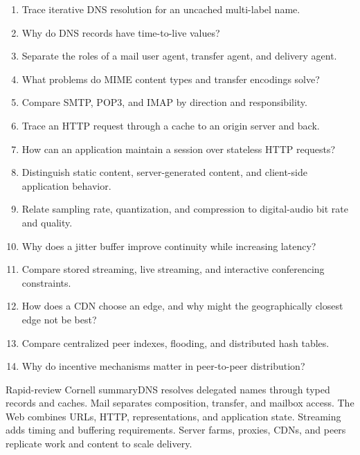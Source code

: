 \documentclass[10pt,letterpaper]{article}
\begin{document}

\begin{enumerate}
  \item Trace iterative DNS resolution for an uncached multi-label name.
  \item Why do DNS records have time-to-live values?
  \item Separate the roles of a mail user agent, transfer agent, and delivery agent.
  \item What problems do MIME content types and transfer encodings solve?
  \item Compare SMTP, POP3, and IMAP by direction and responsibility.
  \item Trace an HTTP request through a cache to an origin server and back.
  \item How can an application maintain a session over stateless HTTP requests?
  \item Distinguish static content, server-generated content, and client-side application behavior.
  \item Relate sampling rate, quantization, and compression to digital-audio bit rate and quality.
  \item Why does a jitter buffer improve continuity while increasing latency?
  \item Compare stored streaming, live streaming, and interactive conferencing constraints.
  \item How does a CDN choose an edge, and why might the geographically closest edge not be best?
  \item Compare centralized peer indexes, flooding, and distributed hash tables.
  \item Why do incentive mechanisms matter in peer-to-peer distribution?
\end{enumerate}
\begin{CornellSummaryBox}{Rapid-review Cornell summary}DNS resolves delegated names through typed records and caches. Mail separates composition, transfer, and mailbox access. The Web combines URLs, HTTP, representations, and application state. Streaming adds timing and buffering requirements. Server farms, proxies, CDNs, and peers replicate work and content to scale delivery.\end{CornellSummaryBox}
\end{document}
